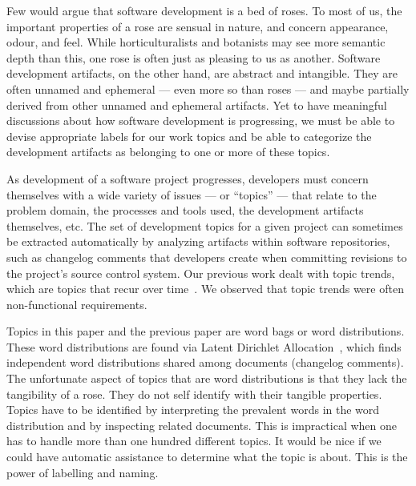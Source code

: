 \documentclass{acm_proc_article-sp}
\begin{document}
Few would argue that software development is a bed of roses.  To most of us, the important properties of a rose are sensual in nature, and concern appearance, odour, and feel.  While horticulturalists and botanists may see more semantic depth than this, one rose is often just as pleasing to us as another.  Software development artifacts, on the other hand, are abstract and intangible.  They are often unnamed and ephemeral --- even more so than roses --- and maybe partially derived from other unnamed and ephemeral artifacts.  Yet to have meaningful discussions about how software development is progressing, we must be able to devise appropriate labels for our work topics and be able to categorize the development artifacts as belonging to one or more of these topics. 





As development of a software project progresses, developers must concern themselves with a wide variety of issues --- or ``topics'' --- that relate to the problem domain, the processes and tools used, the development artifacts themselves, etc.  The set of development topics for a given project can sometimes be extracted automatically by analyzing artifacts within software repositories, such as changelog comments that developers create when committing revisions to the project's source control system.  Our previous work dealt with topic trends, which are topics that recur over time~\cite{Hindle09ICSM}. We observed that topic trends were often non-functional requirements.



Topics in this paper and the previous paper are word bags or word distributions. These word distributions are found via Latent Dirichlet Allocation~\cite{Blei2003}, which finds independent word distributions shared among documents (changelog comments). The unfortunate aspect of topics that are word distributions is that they lack the tangibility of a rose. They do not self identify with their tangible properties. Topics have to be identified by interpreting the prevalent words in the word distribution and by inspecting related documents. This is impractical when one has to handle more than one hundred different topics. It would be nice if we could have automatic assistance to determine what the topic is about. This is the power of labelling and naming.
\end{document}
